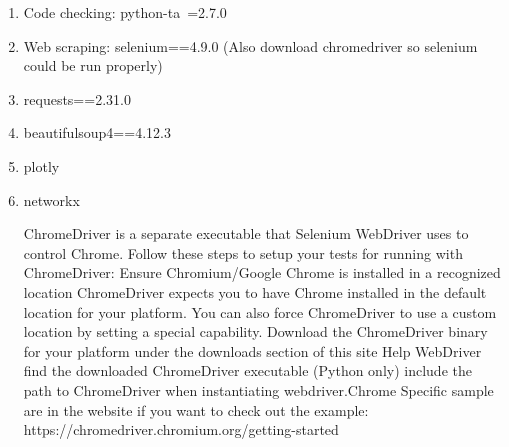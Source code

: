 \documentclass[fontsize=11pt]{article}
\begin{document}
\begin{enumerate}
    \item Code checking: python-ta~=2.7.0
    \item Web scraping: selenium==4.9.0 (Also download chromedriver so selenium could be run properly)
    \item requests==2.31.0
    \item beautifulsoup4==4.12.3
    \item plotly
    \item networkx \newline
    
ChromeDriver is a separate executable that Selenium WebDriver uses to control Chrome.
Follow these steps to setup your tests for running with ChromeDriver: \newline
Ensure Chromium/Google Chrome is installed in a recognized location
ChromeDriver expects you to have Chrome installed in the default location for your platform. You can also force ChromeDriver to use a custom location by setting a special capability. Download the ChromeDriver binary for your platform under the downloads section of this site Help WebDriver find the downloaded ChromeDriver executable
(Python only) include the path to ChromeDriver when instantiating webdriver.Chrome
Specific sample are in the website if you want to check out the example: \newline
https://chromedriver.chromium.org/getting-started
\newline

\end{enumerate}
\end{document}
